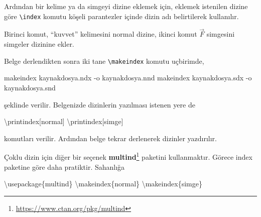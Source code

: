 \documentclass[
  10pt,
]{scrbook}
\newenvironment{Shaded}{}{}
\newcommand{\AttributeTok}[1]{\textcolor[rgb]{0.49,0.56,0.16}{#1}}
\newcommand{\BuiltInTok}[1]{#1}
\newcommand{\ExtensionTok}[1]{#1}
\newcommand{\FunctionTok}[1]{\textcolor[rgb]{0.02,0.16,0.49}{#1}}
\newcommand{\NormalTok}[1]{#1}
\newcommand{\SpecialCharTok}[1]{\textcolor[rgb]{0.25,0.44,0.63}{#1}}
\newcommand{\SpecialStringTok}[1]{\textcolor[rgb]{0.73,0.40,0.53}{#1}}
\renewcommand{\href}[2]{#2\footnote{\url{#1}}}
\theoremstyle{definition}
\theoremstyle{definition}
\theoremstyle{definition}
\theoremstyle{definition}
\theoremstyle{remark}
\begin{document}
Ardından bir kelime ya da simgeyi dizine eklemek için, eklemek istenilen dizine göre \texttt{\textbackslash{}index} komutu köşeli parantezler içinde dizin adı belirtilerek kullanılır.

\begin{Shaded}
\end{Shaded}

Birinci komut, ``kuvvet'' kelimesini normal dizine, ikinci komut \(\vec{F}\) simgesini simgeler dizinine ekler.

Belge derlendikten sonra iki tane \texttt{\textbackslash{}makeindex} komutu uçbirimde,

\begin{Shaded}
\begin{Highlighting}[]
\ExtensionTok{makeindex}\NormalTok{ kaynakdosya.ndx }\AttributeTok{{-}o}\NormalTok{ kaynakdosya.nnd }
\ExtensionTok{makeindex}\NormalTok{ kaynakdosya.sdx }\AttributeTok{{-}o}\NormalTok{ kaynakdosya.snd }
\end{Highlighting}
\end{Shaded}

şeklinde verilir. Belgenizde dizinlerin yazılması istenen yere de

\begin{Shaded}
\begin{Highlighting}[]
\FunctionTok{\textbackslash{}printindex}\NormalTok{[normal]}
\FunctionTok{\textbackslash{}printindex}\NormalTok{[simge]}
\end{Highlighting}
\end{Shaded}

komutları verilir. Ardından belge tekrar derlenerek dizinler yazdırılır.

Çoklu dizin için diğer bir seçenek \href{https://www.ctan.org/pkg/multind}{\textbf{multind}} paketini kullanmaktır. Görece index paketine göre daha pratiktir. Sahanlığa

\begin{Shaded}
\begin{Highlighting}[]
\BuiltInTok{\textbackslash{}usepackage}\NormalTok{\{}\ExtensionTok{multind}\NormalTok{\}}
\FunctionTok{\textbackslash{}makeindex}\NormalTok{\{normal\}}
\FunctionTok{\textbackslash{}makeindex}\NormalTok{\{simge\}}
\end{Highlighting}
\end{Shaded}
\end{document}
